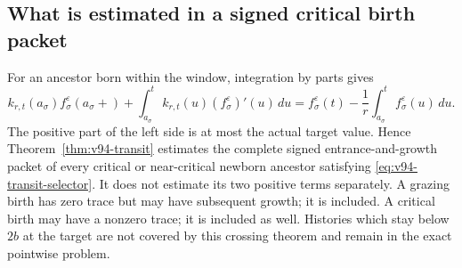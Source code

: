 \subsection{What is estimated in a signed critical birth packet}
For an ancestor born within the window, integration by parts gives
\begin{equation}\label{eq:v94-birth-packet}
 k_{r,t}(a_\sigma)f_\sigma^\varepsilon(a_\sigma+)
 +\int_{a_\sigma}^t k_{r,t}(u)(f_\sigma^\varepsilon)'(u)\,du
 =f_\sigma^\varepsilon(t)-\frac1r\int_{a_\sigma}^t f_\sigma^\varepsilon(u)\,du.
\end{equation}
The positive part of the left side is at most the actual target
value. Hence Theorem~\ref{thm:v94-transit} estimates the complete
signed entrance-and-growth packet of every critical or near-critical
newborn ancestor satisfying \eqref{eq:v94-transit-selector}.
It does not estimate its two positive terms separately. A grazing
birth has zero trace but may have subsequent growth; it is included.
A critical birth may have a nonzero trace; it is included as well.
Histories which stay below $2b$ at the target are not covered by this
crossing theorem and remain in the exact pointwise problem.

